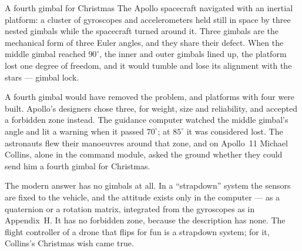 \begin{curiosity}{A fourth gimbal for Christmas}
The Apollo spacecraft navigated with an inertial platform: a cluster of gyroscopes and accelerometers held still in space by three nested gimbals while the spacecraft turned around it. Three gimbals are the mechanical form of three Euler angles, and they share their defect. When the middle gimbal reached $90^\circ$, the inner and outer gimbals lined up, the platform lost one degree of freedom, and it would tumble and lose its alignment with the stars — gimbal lock.

A fourth gimbal would have removed the problem, and platforms with four were built. Apollo's designers chose three, for weight, size and reliability, and accepted a forbidden zone instead. The guidance computer watched the middle gimbal's angle and lit a warning when it passed $70^\circ$; at $85^\circ$ it was considered lost. The astronauts flew their manoeuvres around that zone, and on Apollo~11 Michael Collins, alone in the command module, asked the ground whether they could send him a fourth gimbal for Christmas.

The modern answer has no gimbals at all. In a \enquote{strapdown} system the sensors are fixed to the vehicle, and the attitude exists only in the computer — as a quaternion or a rotation matrix, integrated from the gyroscopes as in Appendix~H. It has no forbidden zone, because the description has none. The flight controller of a drone that flips for fun is a strapdown system; for it, Collins's Christmas wish came true.
\end{curiosity}

